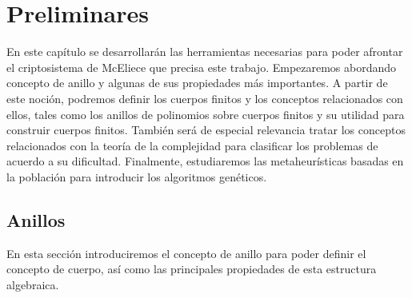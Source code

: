 
\chapter{Preliminares}

En este capítulo se desarrollarán las herramientas necesarias para poder afrontar el criptosistema de McEliece que precisa este trabajo. Empezaremos abordando concepto de anillo y algunas de sus propiedades más importantes. A partir de este noción, podremos definir los cuerpos finitos y los conceptos relacionados con ellos, tales como los anillos de polinomios sobre cuerpos finitos y su utilidad para construir cuerpos finitos. También será de especial relevancia tratar los conceptos relacionados con la teoría de la complejidad para clasificar los problemas de acuerdo a su dificultad. Finalmente, estudiaremos las metaheurísticas basadas en la población para introducir los algoritmos genéticos.

\section{Anillos}

En esta sección introduciremos el concepto de anillo para poder definir el concepto de cuerpo, así como las principales propiedades de esta estructura algebraica.


